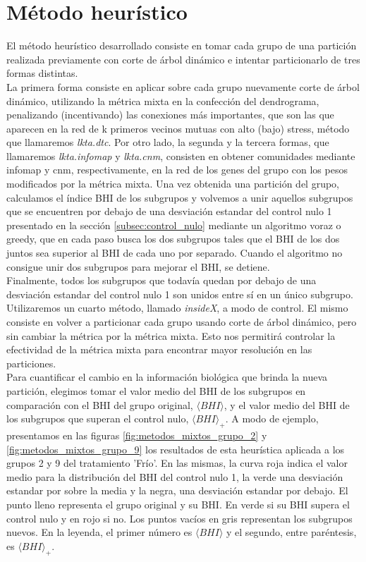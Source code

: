 \section{Método heurístico}
El método heurístico desarrollado consiste en tomar cada grupo de una partición realizada previamente con corte de árbol dinámico e intentar particionarlo de tres formas distintas.\\
La primera forma consiste en aplicar sobre cada grupo nuevamente corte de árbol dinámico, utilizando la métrica mixta en la confección del dendrograma, penalizando (incentivando) las conexiones más importantes, que son las que aparecen en la red de k primeros vecinos mutuas con alto (bajo) stress, método que llamaremos \textit{lkta.dtc}. Por otro lado, la segunda y la tercera formas, que llamaremos \textit{lkta.infomap} y \textit{lkta.cnm}, consisten en obtener comunidades mediante infomap y cnm, respectivamente, en la red de los genes del grupo con los pesos modificados por la métrica mixta. Una vez obtenida una partición del grupo, calculamos el índice BHI de los subgrupos y volvemos a unir aquellos subgrupos que se encuentren por debajo de una desviación estandar del control nulo 1 presentado en la sección \ref{subsec:control_nulo} mediante un algoritmo voraz o greedy, que en cada paso busca los dos subgrupos tales que el BHI de los dos juntos sea superior al BHI de cada uno por separado. Cuando el algoritmo no consigue unir dos subgrupos para mejorar el BHI, se detiene.\\ Finalmente, todos los subgrupos que todavía quedan por debajo de una desviación estandar del control nulo 1 son unidos entre sí en un único subgrupo.\\
Utilizaremos un cuarto método, llamado \textit{insideX}, a modo de control. El mismo consiste en volver a particionar cada grupo usando corte de árbol dinámico, pero sin cambiar la métrica por la métrica mixta. Esto nos permitirá controlar la efectividad de la métrica mixta para encontrar mayor resolución en las particiones.\\
Para cuantificar el cambio en la información biológica que brinda la nueva partición, elegimos tomar el valor medio del BHI de los subgrupos en comparación con el BHI del grupo original, $\langle BHI \rangle$, y el valor medio del BHI de los subgrupos que superan el control nulo, $\langle BHI \rangle _{+}$. 
A modo de ejemplo, presentamos en las figuras \ref{fig:metodos_mixtos_grupo_2} y \ref{fig:metodos_mixtos_grupo_9} los resultados de esta heurística aplicada a los grupos 2 y 9 del tratamiento 'Frío'. En las mismas, la curva roja indica el valor medio para la distribución del BHI del control nulo 1, la verde una desviación estandar por sobre la media y la negra, una desviación estandar por debajo. El punto lleno representa el grupo original y su BHI. En verde si su BHI supera el control nulo y en rojo si no. Los puntos vacíos en gris representan los subgrupos nuevos. En la leyenda, el primer número es $\langle BHI \rangle$ y el segundo, entre paréntesis, es $\langle BHI \rangle _{+}$.\\
